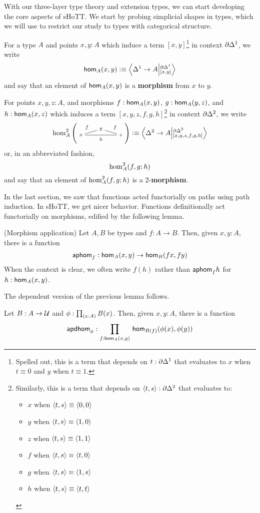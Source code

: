 \documentclass[main.tex]{subfiles}
\begin{document}
With our three-layer type theory and extension types, we can start developing the core aspects of sHoTT. We start by probing simplicial
shapes in types, which we will use to restrict our study to types with categorical structure.

\begin{definition}
    For a type $A$ and points $x,y : A$ which induce a term $[x,y]$\footnote{Spelled out, this is a term that depends on $t : \pardo $ that evaluates to $x$ when $t \equiv 0$ and $y$ when $t \equiv 1$.} in context $\pardo$, we write
    $$\ho[A]{x}{y} \defeq \ndexten{\osx}{A}{\pardo}{[x,y]}$$
    and say that an element of $\ho[A]{x}{y}$ is a \textbf{morphism} from $x$ to $y$. 
\end{definition}
\begin{definition}
    For points $x,y,z : A$, and morphisms $f : \ho[A]{x}{y}$, $g : \ho[A]{y}{z}$, and $h : \ho[A]{x}{z}$ which induces a term $[x,y,z,f,g,h]$\footnote{Similarly, this is a term that depends on $\pair{t}{s} :\pardt$ that evaluates to:
    \begin{itemize}
        \item $x$ when $\pair{t}{s} \equiv \pair{0}{0}$ 
        \item $y$ when $\pair{t}{s} \equiv \pair{1}{0}$ 
        \item $z$ when $\pair{t}{s} \equiv \pair{1}{1}$
        \item $f$ when $\pair{t}{s} \equiv \pair{t}{0}$
        \item $g$ when $\pair{t}{s} \equiv \pair{1}{s}$
        \item $h$ when $\pair{t}{s} \equiv \pair{t}{t}$
    \end{itemize} } in context $\pardt$, we write
    $$\homtwo{A}(x,y,z,f,f,h) \defeq \ndexten{\tsx}{A}{\pardt}{[x,y,z,f,g,h]}$$
    or, in an abbreviated fashion,
    $$\homtwoshort{A}(x,y,z,f,g,h)$$
    and say that an element of $\homtwoshort{A}(x,y,z,f,g,h)$ is a $2$-\textbf{morphism}.
\end{definition}


In the last section, we saw that functions acted functorially on paths using path induction. In sHoTT, we get nicer behavior.
Functions definitionally act functorially on morphisms, edified by the following lemma. 
\begin{lemma}(Morphism application)
    Let $A,B$ be types and $f : A \to B$. Then, given $x,y : A$, there is a function 
    \[\mapfunc{f} : \ho[A]{x}{y} \to \ho[B]{f x}{f y}\]
    When the context is clear, we often write $f(h)$ rather than $\mapfunc{f}h$ for $h : \ho[A]{x}{y}$.
\end{lemma}
The dependent version of the previous lemma follows.
\begin{lemma}
    Let $B : A \to \U$ and $\phi : \prd{x : A}B(x)$. Then, given $x,y : A$, there is a function
    $$\mapdepfunc{\phi} : \prd{f : \ho[A]{x}{y}}\ho[B(f)]{\phi(x)}{\phi(y)}$$
\end{lemma}
\end{document}
